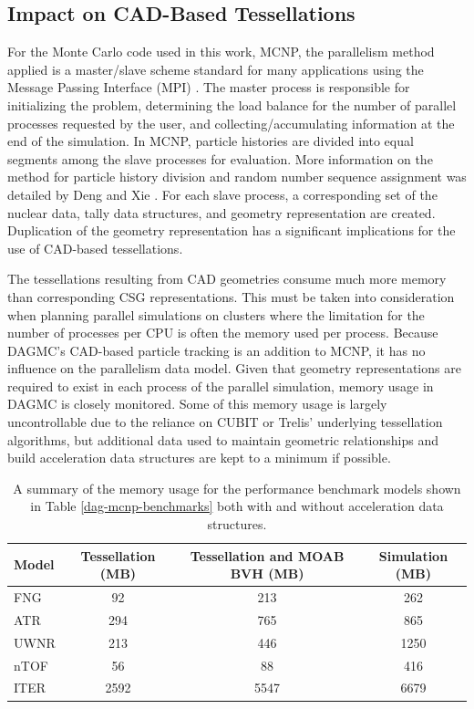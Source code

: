 \subsection{Impact on CAD-Based Tessellations}

For the Monte Carlo code used in this work, MCNP, the parallelism method applied
is a master/slave scheme standard for many applications using the Message
Passing Interface (MPI) \cite{Forum_1994}. The master process is responsible for
initializing the problem, determining the load balance for the number of
parallel processes requested by the user, and collecting/accumulating
information at the end of the simulation. In MCNP, particle histories are
divided into equal segments among the slave processes for evaluation. More
information on the method for particle history division and random number
sequence assignment was detailed by Deng and Xie \cite{Deng_1999}. For each
slave process, a corresponding set of the nuclear data, tally data structures,
and geometry representation are created. Duplication of the geometry
representation has a significant implications for the use of CAD-based
tessellations.

The tessellations resulting from CAD geometries consume much more memory than
corresponding CSG representations. This must be taken into consideration when
planning parallel simulations on clusters where the limitation for the number of
processes per CPU is often the memory used per process. Because DAGMC's
CAD-based particle tracking is an addition to MCNP, it has no influence on the
parallelism data model. Given that geometry representations are required to
exist in each process of the parallel simulation, memory usage in DAGMC is
closely monitored. Some of this memory usage is largely uncontrollable due to
the reliance on CUBIT or Trelis' underlying tessellation algorithms, but
additional data used to maintain geometric relationships and build acceleration
data structures are kept to a minimum if possible.

\begin{table}[H]
    \centering
  \begin{tabular}{l c c c}
    \toprule
    Model & Tessellation (MB) & Tessellation and MOAB BVH (MB) & Simulation (MB) \\
    \hline
    FNG   & 92           & 213  & 262  \\
    ATR   & 294          & 765  & 865  \\
    UWNR  & 213          & 446  & 1250 \\
    nTOF  & 56           &  88  & 416  \\
    ITER  & 2592         & 5547 & 6679 \\
    \hline
  \end{tabular}
  \caption[Memory summary of performance benchmark models.]{A summary of the
    memory usage for the performance benchmark models shown in Table
    \ref{dag-mcnp-benchmarks} both with and without acceleration data structures.}
  \label{tab:dag-mcnp-benchmarks-mem}
\end{table}

